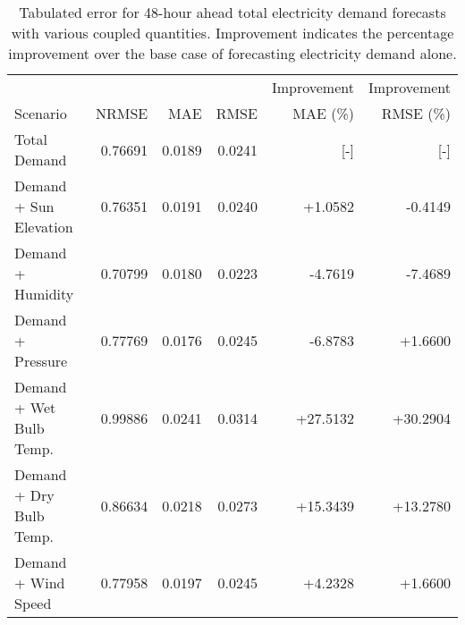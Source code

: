   \begin{table*}[h]
    \centering
    \caption{Tabulated error for 48-hour ahead total electricity demand
    forecasts with various coupled quantities. Improvement indicates the
    percentage improvement over the base case of forecasting electricity demand
    alone.}
    \label{tab:demand48}
    \begin{tabular}{l|r|r|r|r|r}
      & & & & Improvement & Improvement \\
      Scenario &NRMSE & MAE & RMSE & MAE (\%) & RMSE (\%)\\
      \hline
      Total Demand & 0.76691 & 0.0189 & 0.0241 & [-] & [-] \\
      Demand + Sun Elevation & 0.76351 & 0.0191 & 0.0240 & +1.0582 & -0.4149 \\
      Demand + Humidity & 0.70799 & 0.0180 & 0.0223 & -4.7619 & -7.4689 \\
      Demand + Pressure & 0.77769 & 0.0176 & 0.0245 & -6.8783 & +1.6600 \\
      Demand + Wet Bulb Temp. & 0.99886 & 0.0241 & 0.0314 & +27.5132 & +30.2904
      \\
      Demand + Dry Bulb Temp. & 0.86634 & 0.0218 & 0.0273 & +15.3439 & +13.2780
      \\
      Demand + Wind Speed & 0.77958 & 0.0197 & 0.0245 & +4.2328 & +1.6600 \\
    \end{tabular}
  \end{table*}
